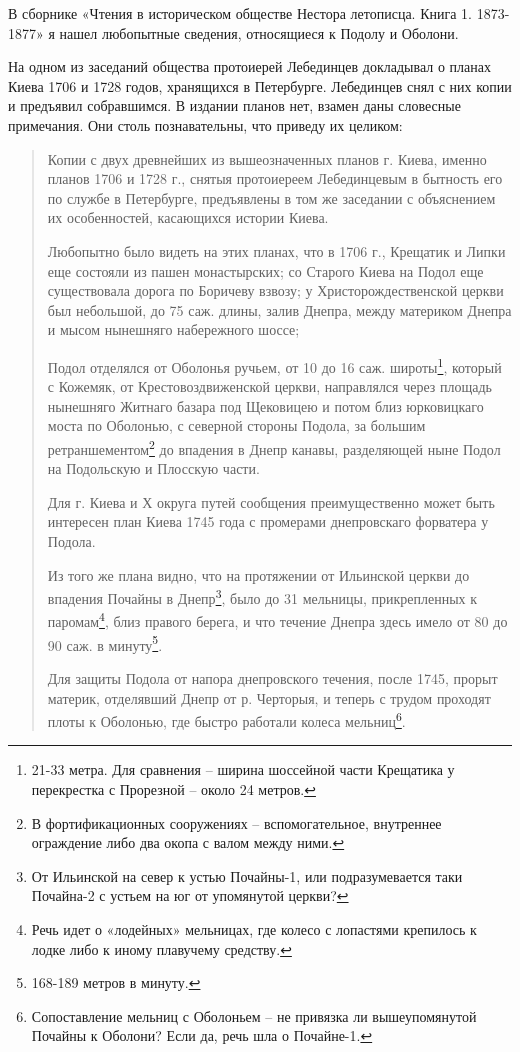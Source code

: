 В сборнике «Чтения в историческом обществе Нестора летописца. Книга 1. 1873-1877» я нашел любопытные сведения, относящиеся к Подолу и Оболони. 

На одном из заседаний общества протоиерей Лебединцев докладывал о планах Киева 1706 и 1728 годов, хранящихся в Петербурге. Лебединцев снял с них копии и предъявил собравшимся. В издании планов нет, взамен даны словесные примечания. Они столь познавательны, что приведу их целиком:

\begin{quotation}
Копии с двух древнейших из вышеозначенных планов г. Киева, именно планов 1706 и 1728 г., снятыя протоиереем Лебединцевым в бытность его по службе в Петербурге, предъявлены в том же заседании с объяснением их особенностей, касающихся истории Киева.

Любопытно было видеть на этих планах, что в 1706 г., Крещатик и Липки еще состояли из пашен монастырских; со Старого Киева на Подол еще существовала дорога по Боричеву взвозу; у Христорождественской церкви был небольшой, до 75 саж. длины, залив Днепра, между материком Днепра и мысом нынешняго набережного шоссе;

Подол отделялся от Оболонья ручьем, от 10 до 16 саж. широты\footnote{21-33 метра. Для сравнения – ширина шоссейной части Крещатика у перекрестка с Прорезной – около 24 метров.}, который с Кожемяк, от Крестовоздвиженской церкви, направлялся через площадь нынешняго Житнаго базара под Щековицею и потом близ юрковицкаго моста по Оболонью, с северной стороны Подола, за большим ретраншементом\footnote{В фортификационных сооружениях – вспомогательное, внутреннее ограждение либо два окопа с валом между ними.} до впадения в Днепр канавы, разделяющей ныне Подол на Подольскую и Плосскую части.

Для г. Киева и Х округа путей сообщения преимущественно может быть интересен план Киева 1745 года с промерами днепровскаго форватера у Подола. 

Из того же плана видно, что на протяжении от Ильинской церкви до впадения Почайны в Днепр\footnote{От Ильинской на север к устью Почайны-1, или подразумевается таки Почайна-2 с устьем на юг от упомянутой церкви?}, было до 31 мельницы, прикрепленных к паромам\footnote{Речь идет о «лодейных» мельницах, где колесо с лопастями крепилось к лодке либо к иному плавучему средству.}, близ правого берега, и что течение Днепра здесь имело от 80 до 90 саж. в минуту\footnote{168-189 метров в минуту.}. 

Для защиты Подола от напора днепровского течения, после 1745, прорыт материк, отделявший Днепр от р. Черторыя, и теперь с трудом проходят плоты к Оболонью, где быстро работали колеса мельниц\footnote{Сопоставление мельниц с Оболоньем – не привязка ли вышеупомянутой Почайны к Оболони? Если да, речь шла о Почайне-1.}.
\end{quotation}

